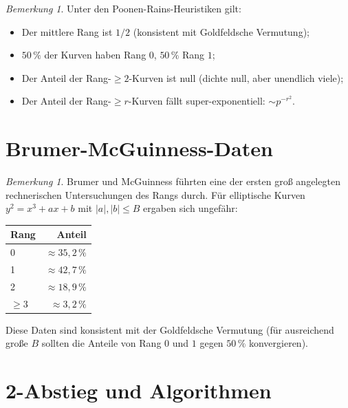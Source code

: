 \documentclass[12pt,a4paper]{amsart}
\theoremstyle{definition}
\theoremstyle{remark}
\newtheorem{bemerkung}[theorem]{Bemerkung}
\begin{document}
\begin{bemerkung}
  Unter den Poonen-Rains-Heuristiken gilt:
  \begin{itemize}
    \item Der mittlere Rang ist $1/2$ (konsistent mit Goldfeldsche Vermutung);
    \item $50\,\%$ der Kurven haben Rang $0$, $50\,\%$ Rang $1$;
    \item Der Anteil der Rang-$\geq 2$-Kurven ist null (dichte null, aber unendlich viele);
    \item Der Anteil der Rang-$\geq r$-Kurven fällt super-exponentiell: $\sim p^{-r^2}$.
  \end{itemize}
\end{bemerkung}

\section{Brumer-McGuinness-Daten}\label{sec:daten}

\begin{bemerkung}
  Brumer und McGuinness \cite{BM1990} führten eine der ersten groß angelegten
  rechnerischen Untersuchungen des Rangs durch. Für elliptische Kurven
  $y^2 = x^3 + ax + b$ mit $|a|, |b| \leq B$ ergaben sich ungefähr:
  \begin{center}
    \begin{tabular}{lr}
      \toprule
      Rang & Anteil \\
      \midrule
      0 & $\approx 35{,}2\,\%$ \\
      1 & $\approx 42{,}7\,\%$ \\
      2 & $\approx 18{,}9\,\%$ \\
      $\geq 3$ & $\approx 3{,}2\,\%$ \\
      \bottomrule
    \end{tabular}
  \end{center}
  Diese Daten sind konsistent mit der Goldfeldsche Vermutung (für ausreichend große $B$
  sollten die Anteile von Rang $0$ und $1$ gegen $50\,\%$ konvergieren).
\end{bemerkung}

\section{2-Abstieg und Algorithmen}\label{sec:abstieg}
\end{document}
